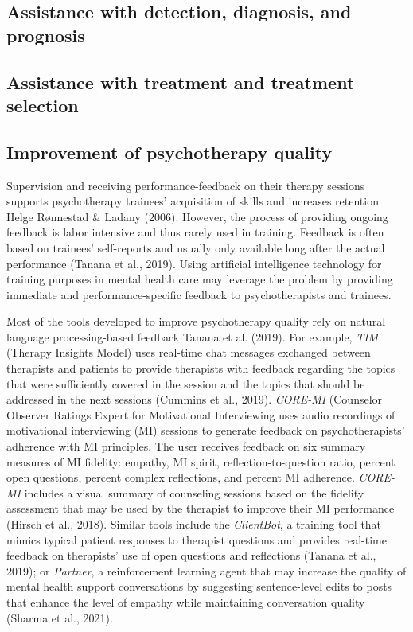 \documentclass[
  man]{apa7}
\begin{document}
\hypertarget{assistance-with-detection-diagnosis-and-prognosis}{%
\subsection{Assistance with detection, diagnosis, and prognosis}\label{assistance-with-detection-diagnosis-and-prognosis}}

\hypertarget{assistance-with-treatment-and-treatment-selection}{%
\subsection{Assistance with treatment and treatment selection}\label{assistance-with-treatment-and-treatment-selection}}

\hypertarget{improvement-of-psychotherapy-quality}{%
\subsection{Improvement of psychotherapy quality}\label{improvement-of-psychotherapy-quality}}

Supervision and receiving performance-feedback on their therapy sessions supports psychotherapy trainees' acquisition of skills and increases retention Helge Rønnestad \& Ladany (2006).
However, the process of providing ongoing feedback is labor intensive and thus rarely used in training.
Feedback is often based on trainees' self-reports and usually only available long after the actual performance (Tanana et al., 2019).
Using artificial intelligence technology for training purposes in mental health care may leverage the problem by providing immediate and performance-specific feedback to psychotherapists and trainees.

Most of the tools developed to improve psychotherapy quality rely on natural language processing-based feedback Tanana et al. (2019).
For example, \emph{TIM} (Therapy Insights Model) uses real-time chat messages exchanged between therapists and patients to provide therapists with feedback regarding the topics that were sufficiently covered in the session and the topics that should be addressed in the next sessions (Cummins et al., 2019). \emph{CORE-MI} (Counselor Observer Ratings Expert for Motivational Interviewing uses audio recordings of motivational interviewing (MI) sessions to generate feedback on psychotherapists' adherence with MI principles.
The user receives feedback on six summary measures of MI fidelity: empathy, MI spirit, reflection-to-question ratio, percent open questions, percent complex reflections, and percent MI adherence.
\emph{CORE-MI} includes a visual summary of counseling sessions based on the fidelity assessment that may be used by the therapist to improve their MI performance (Hirsch et al., 2018). Similar tools include the \emph{ClientBot}, a training tool that mimics typical patient responses to therapist questions and provides real-time feedback on therapists' use of open questions and reflections (Tanana et al., 2019); or \emph{Partner}, a reinforcement learning agent that may increase the quality of mental health support conversations by suggesting sentence-level edits to posts that enhance the level of empathy while maintaining conversation quality (Sharma et al., 2021).
\end{document}
